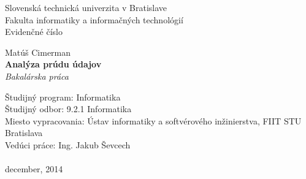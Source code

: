 \documentclass[11pt, a4paper, titlepage, slovak]{book}
\begin{document}
\begin{titlepage}
\begin{center}                                                                                                                                                   
{\Large Slovenská technická univerzita v Bratislave} \\
{\Large Fakulta informatiky a informačných technológií} \\
\vspace*{1\baselineskip}
\large {Evidenčné číslo}
\vfill %


{{Matúš Cimerman}} \\
\vspace*{1\baselineskip}
{\huge {\textbf{Analýza prúdu údajov}}} %
\\
\vspace*{1\baselineskip}
\textit{Bakalárska práca}\\
\vfill %
\end{center}
{Študijný program: Informatika}\\
{Študijný odbor: 9.2.1 Informatika}\\
{Miesto vypracovania: Ústav informatiky a softvérového inžinierstva, FIIT STU Bratislava}\\
{Vedúci práce: Ing. Jakub Ševcech}\\
\\
{december, 2014}

\end{titlepage}
\restoregeometry
\thispagestyle{empty}
\emptydoublepage

%


\emptydoublepage


\emptydoublepage

%

\renewcommand{\contentsname}{Obsah}
\singlespacing
\tableofcontents
\emptydoublepage
\onehalfspacing
%
%
\end{document}
